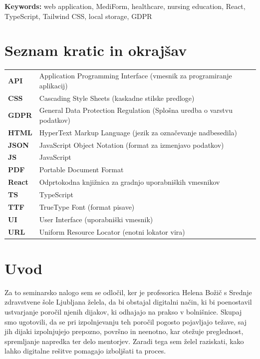 \documentclass[12pt,a4paper]{article}
\newcommand{\romanpages}{%
  \setcounter{page}{1}%
  \pagenumbering{Roman}%
  \pagestyle{fancy}%
  \fancyhf{}%
  \fancyfoot[C]{\thepage}%
}
\newcommand{\arabicpages}{%
  \pagenumbering{arabic}%
  \setcounter{page}{7}%
}
\begin{document}
\textbf{Keywords:} web application, MediForm, healthcare, nursing education, React, TypeScript, Tailwind CSS, local storage, GDPR

\newpage
\thispagestyle{empty}

\section*{Seznam kratic in okrajšav}

\noindent\begin{tabular}{@{}l p{13cm}@{}}
\textbf{API} & Application Programming Interface (vmesnik za programiranje aplikacij) \\
\textbf{CSS} & Cascading Style Sheets (kaskadne stilske predloge) \\
\textbf{GDPR} & General Data Protection Regulation (Splošna uredba o varstvu podatkov) \\
\textbf{HTML} & HyperText Markup Language (jezik za označevanje nadbesedila) \\
\textbf{JSON} & JavaScript Object Notation (format za izmenjavo podatkov) \\
\textbf{JS} & JavaScript \\
\textbf{PDF} & Portable Document Format \\
\textbf{React} & Odprtokodna knjižnica za gradnjo uporabniških vmesnikov \\
\textbf{TS} & TypeScript \\
\textbf{TTF} & TrueType Font (format pisave) \\
\textbf{UI} & User Interface (uporabniški vmesnik) \\
\textbf{URL} & Uniform Resource Locator (enotni lokator vira) \\
\end{tabular}


\newpage
\romanpages

\renewcommand{\contentsname}{Kazalo vsebine}
\tableofcontents

\newpage

\listoffigures

\newpage
\arabicpages
\setcounter{page}{7}

\section{Uvod}

Za to seminarsko nalogo sem se odlo\v{c}il, ker je profesorica Helena Bo\v{z}i\v{c} s Srednje zdravstvene \v{s}ole Ljubljana \v{z}elela, da bi obstajal digitalni na\v{c}in, ki bi poenostavil ustvarjanje poro\v{c}il njenih dijakov, ki odhajajo na prakso v bolni\v{s}nice. Skupaj smo ugotovili, da se pri izpolnjevanju teh poro\v{c}il pogosto pojavljajo te\v{z}ave, saj jih dijaki izpolnjujejo prepozno, povr\v{s}no in neenotno, kar ote\v{z}uje preglednost, spremljanje napredka ter delo mentorjev. Zaradi tega sem \v{z}elel raziskati, kako lahko digitalne re\v{s}itve pomagajo izbolj\v{s}ati ta proces.
\end{document}
